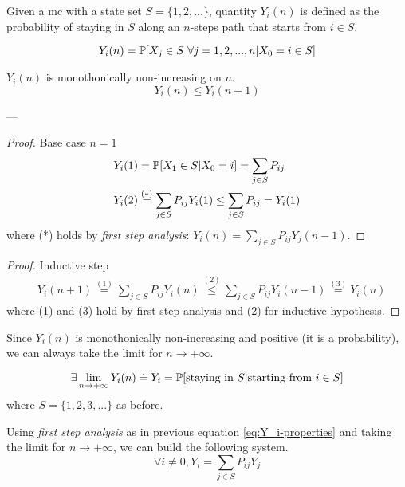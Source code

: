 	\begin{definition}
		Given a \gls{mc} with a state set $S = \{1, 2, ...\}$, quantity $Y_i(n)$ is defined as the probability of staying in $S$ along an $n$-steps path that starts from $i \in S$.

		$$ Y_i(n) = \mathbb{P}[X_j \in S ~\forall j=1, 2, ..., n | X_0 = i \in S] $$
	\end{definition}

	\begin{theorem}
		$Y_i(n)$ is monothonically non-increasing on $n$.
		$$ Y_i(n) \le Y_i(n-1) $$
	\end{theorem}
	---
	\begin{proof} Base case $n=1$
		\begin{equation}\begin{split} \label{eq:Y_i-properties}
			& Y_i(1) = \mathbb{P}[X_1 \in S | X_0 = i] = \sum_{j \in S} P_{ij} \\
			& Y_i(2) \stackrel{(*)}{=} \sum_{j \in S} P_{ij} Y_i(1) \le \sum_{j \in S} P_{ij} = Y_i(1)
		\end{split}\end{equation}
		where (*) holds by \emph{first step analysis}: $ Y_i(n) = \sum_{j \in S} P_{ij} Y_j(n-1) $.
	\end{proof}

	\begin{proof} Inductive step
		\begin{equation}\begin{split}
			& Y_i(n+1) \stackrel{(1)}{=} \sum_{j \in S} P_{ij} Y_i(n) \stackrel{(2)}{\le} \sum_{j \in S} P_{ij} Y_i(n-1) \stackrel{(3)}{=} Y_i(n)
		\end{split}\end{equation}
		where (1) and (3) hold by first step analysis and (2) for inductive hypothesis.
	\end{proof}

	\begin{lemma}
		Since $Y_i(n)$ is monothonically non-increasing and positive (it is a probability), we can always take the limit for $n \to +\infty$.

		$$ \exists \lim_{n \to +\infty} Y_i(n) \stackrel{.}{=} Y_i = \mathbb{P}[\text{staying in } S | \text{starting from } i \in S] $$
		where $ S = \{ 1, 2, 3, ...\} $ as before.

		Using \emph{first step analysis} as in previous equation \eqref{eq:Y_i-properties} and taking the limit for $n \to +\infty $, we can build the following system.
		\begin{equation} \label{eq:Yj_system}
			\forall i \neq 0, Y_i = \sum_{j \in S} P_{ij} Y_j
		\end{equation}
	\end{lemma}

